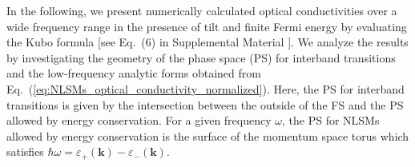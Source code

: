 \documentclass[aps,twocolumn,floatfix]{revtex4-1}
\begin{document}
In the following, we present numerically calculated optical conductivities over a wide frequency range in the presence of tilt and finite Fermi energy by evaluating the Kubo formula [see Eq.~(6) in Supplemental Material \cite{supplemental}]. We analyze the results by investigating the geometry of the phase space (PS) for interband transitions and the low-frequency analytic forms obtained from Eq.~(\ref{eq:NLSMs_optical_conductivity_normalized}).
Here, the PS for interband transitions is given by the intersection between the outside of the FS and the PS allowed by energy conservation.
For a given frequency $\omega$, the PS for NLSMs allowed by energy conservation is the surface of the momentum space torus which satisfies $\hbar\omega=\varepsilon_{+}(\bm{k})-\varepsilon_{-}(\bm{k})$.
\end{document}
